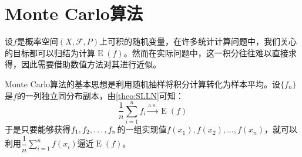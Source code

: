 \section{Monte Carlo算法}

设$f$是概率空间$(X,\mathscr{F},P)$上可积的随机变量，在许多统计计算问题中，我们关心的目标都可以归结为计算$\operatorname{E}(f)$。然而在实际问题中，这一积分往往难以直接求得，因此需要借助数值方法对其进行近似。\par
Monte Carlo算法的基本思想是利用随机抽样将积分计算转化为样本平均。设$\{f_n\}$是$f$的一列独立同分布副本，由\cref{theo:SLLN}可知：
\begin{equation*}
	\frac{1}{n}\sum_{i=1}^{n}f_i\overset{\text{a.s.}}{\longrightarrow}\operatorname{E}(f)
\end{equation*}
于是只要能够获得$f_1, f_2, \dots, f_{n}$的一组实现值$f(x_1),f(x_2),\dots,f(x_n)$，就可以利用$\dfrac{1}{n}\sum\limits_{i=1}^{n}f(x_i)$逼近$\operatorname{E}(f)$。

